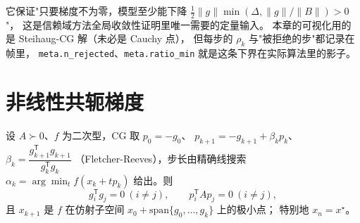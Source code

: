 \begin{remark}[这个下界是干什么用的]
它保证"只要梯度不为零，模型至少能下降 $\frac12\|g\|\min(\Delta,\|g\|/\|B\|)>0$"，
这是信赖域方法全局收敛性证明里唯一需要的定量输入。
本章的可视化用的是 Steihaug-CG 解（未必是 Cauchy 点），
但每步的 $\rho_k$ 与"被拒绝的步"都记录在帧里，
\texttt{meta.n\_rejected}、\texttt{meta.ratio\_min} 就是这条下界在实际算法里的影子。
\end{remark}

\section{非线性共轭梯度}

\begin{theorem}
\label{thm:cg}
设 $A\succ0$、$f$ 为二次型，CG 取 $p_0=-g_0$、
$p_{k+1}=-g_{k+1}+\beta_kp_k$、$\beta_k=\dfrac{g_{k+1}^{\mathsf T}g_{k+1}}{g_k^{\mathsf T}g_k}$
（Fletcher-Reeves），步长由精确线搜索 $\alpha_k=\arg\min_t f(x_k+tp_k)$ 给出。则
\[
  g_i^{\mathsf T}g_j=0\ (i\ne j),\qquad p_i^{\mathsf T}Ap_j=0\ (i\ne j),
\]
且 $x_{k+1}$ 是 $f$ 在仿射子空间 $x_0+\mathrm{span}\{g_0,\dots,g_k\}$ 上的极小点；
特别地 $x_n=x^\star$。
\end{theorem}

